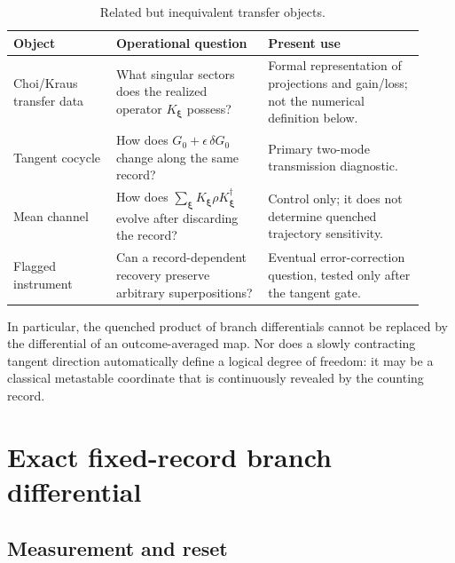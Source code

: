 \documentclass[aps,prb,onecolumn,nofootinbib,superscriptaddress]{revtex4-2}
\newcommand{\bxi}{\boldsymbol{\xi}}
\begin{document}
\begin{table}[h]
\caption{\label{tab:objects}Related but inequivalent transfer objects.}
\begin{ruledtabular}
\begin{tabular}{p{0.23\linewidth}p{0.34\linewidth}p{0.35\linewidth}}
Object & Operational question & Present use \\
\hline
Choi/Kraus transfer data & What singular sectors does the realized operator
$K_{\bxi}$ possess? & Formal representation of projections and gain/loss; not
the numerical definition below. \\
Tangent cocycle & How does $G_0+\epsilon\,\delta G_0$ change along the same
record? & Primary two-mode transmission diagnostic. \\
Mean channel & How does $\sum_{\bxi}K_{\bxi}\rho K_{\bxi}^\dagger$ evolve
after discarding the record? & Control only; it does not determine quenched
trajectory sensitivity. \\
Flagged instrument & Can a record-dependent recovery preserve arbitrary
superpositions? & Eventual error-correction question, tested only after the
tangent gate. \\
\end{tabular}
\end{ruledtabular}
\end{table}

In particular, the quenched product of branch differentials cannot be replaced
by the differential of an outcome-averaged map.  Nor does a slowly contracting
tangent direction automatically define a logical degree of freedom: it may be
a classical metastable coordinate that is continuously revealed by the
counting record.

\section{Exact fixed-record branch differential}
\label{sec:differential}

\subsection{Measurement and reset}
\end{document}
